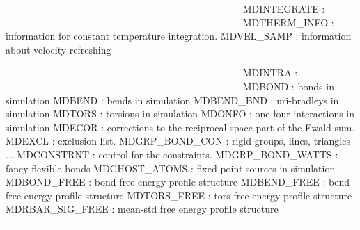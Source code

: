                                                        ------------------------------------------------------------------------
                                                       MDINTEGRATE :
                                                       ------------------------------------------------------------------------
                                                       MDTHERM_INFO   : information for constant temperature integration.
                                                       MDVEL_SAMP     : information about velocity refreshing
                                                       ------------------------------------------------------------------------


                                                       ------------------------------------------------------------------------
                                                       MDINTRA :
                                                       ------------------------------------------------------------------------
                                                       MDBOND           : bonds in simulation
                                                       MDBEND           : bends in simulation
                                                       MDBEND_BND       : uri-bradleys in simulation
                                                       MDTORS           : torsions in simulation
                                                       MDONFO           : one-four interactions in simulation
                                                       MDECOR           : corrections to the reciprocal space part of the 
                                                       Ewald sum.
                                                       MDEXCL           : exclusion list.
                                                       MDGRP_BOND_CON   : rigid groups, lines, triangles ...
                                                       MDCONSTRNT       : control for the constraints.
                                                       MDGRP_BOND_WATTS : fancy flexible bonds
                                                       MDGHOST_ATOMS    : fixed point sources in simulation
                                                       MDBOND_FREE      : bond free energy profile structure
                                                       MDBEND_FREE      : bend free energy profile structure
                                                       MDTORS_FREE      : tors free energy profile structure
                                                       MDRBAR_SIG_FREE  : mean-std free energy profile structure
                                                       ------------------------------------------------------------------------


